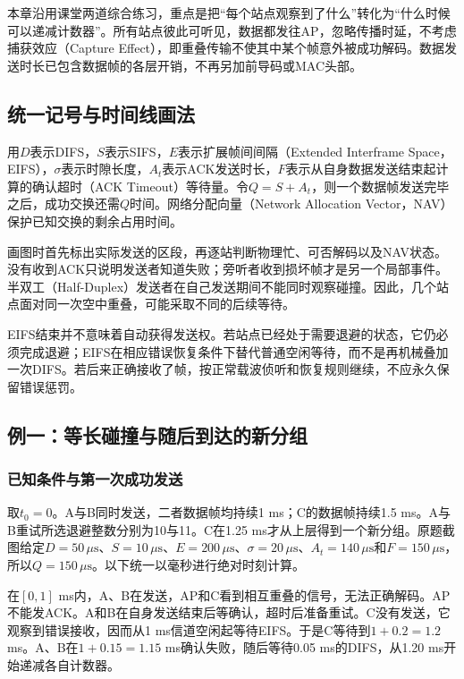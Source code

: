 本章沿用课堂两道综合练习，重点是把“每个站点观察到了什么”转化为“什么时候可以递减计数器”。所有站点彼此可听见，数据都发往AP，忽略传播时延，不考虑捕获效应（Capture Effect），即重叠传输不使其中某个帧意外被成功解码。数据发送时长已包含数据帧的各层开销，不再另加前导码或MAC头部。

\subsection{统一记号与时间线画法}

用$D$表示DIFS，$S$表示SIFS，$E$表示扩展帧间间隔（Extended Interframe Space，EIFS），$\sigma$表示时隙长度，$A_{t}$表示ACK发送时长，$F$表示从自身数据发送结束起计算的确认超时（ACK Timeout）等待量。令$Q=S+A_{t}$，则一个数据帧发送完毕之后，成功交换还需$Q$时间。网络分配向量（Network Allocation Vector，NAV）保护已知交换的剩余占用时间。

画图时首先标出实际发送的区段，再逐站判断物理忙、可否解码以及NAV状态。没有收到ACK只说明发送者知道失败；旁听者收到损坏帧才是另一个局部事件。半双工（Half-Duplex）发送者在自己发送期间不能同时观察碰撞。因此，几个站点面对同一次空中重叠，可能采取不同的后续等待。

EIFS结束并不意味着自动获得发送权。若站点已经处于需要退避的状态，它仍必须完成退避；EIFS在相应错误恢复条件下替代普通空闲等待，而不是再机械叠加一次DIFS。若后来正确接收了帧，按正常载波侦听和恢复规则继续，不应永久保留错误惩罚。

\subsection{例一：等长碰撞与随后到达的新分组}

\subsubsection{已知条件与第一次成功发送}

取$t_0=0$。A与B同时发送，二者数据帧均持续1 ms；C的数据帧持续1.5 ms。A与B重试所选退避整数分别为10与11。C在1.25 ms才从上层得到一个新分组。原题截图给定$D=50\,\mu\mathrm{s}$、$S=10\,\mu\mathrm{s}$、$E=200\,\mu\mathrm{s}$、$\sigma=20\,\mu\mathrm{s}$、$A_t=140\,\mu\mathrm{s}$和$F=150\,\mu\mathrm{s}$，所以$Q=150\,\mu\mathrm{s}$。以下统一以毫秒进行绝对时刻计算。

在$[0,1]$ ms内，A、B在发送，AP和C看到相互重叠的信号，无法正确解码。AP不能发ACK。A和B在自身发送结束后等确认，超时后准备重试。C没有发送，它观察到错误接收，因而从1 ms信道空闲起等待EIFS。于是C等待到$1+0.2=1.2$ ms。A、B在$1+0.15=1.15$ ms确认失败，随后等待0.05 ms的DIFS，从1.20 ms开始递减各自计数器。

